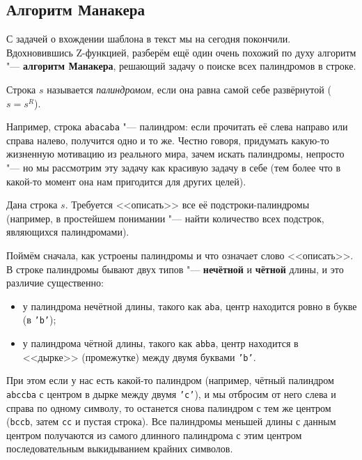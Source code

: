 \subsection{Алгоритм Манакера}

С задачей о вхождении шаблона в текст мы на сегодня покончили. Вдохновившись Z-функцией, разберём ещё один очень похожий по духу алгоритм "--- \textbf{алгоритм Манакера}, решающий задачу о поиске всех палиндромов в строке.

\begin{definition}
    Строка $s$ называется \textit{палиндромом}, если она равна самой себе развёрнутой ($s = s^R$).
\end{definition}

Например, строка \texttt{abacaba} "--- палиндром: если прочитать её слева направо или справа налево, получится одно и то же. Честно говоря, придумать какую-то жизненную мотивацию из реального мира, зачем искать палиндромы, непросто "--- но мы рассмотрим эту задачу как красивую задачу в себе (тем более что в какой-то момент она нам пригодится для других целей).

\begin{problem}
    Дана строка $s$. Требуется <<описать>> все её подстроки-палиндромы (например, в простейшем понимании "--- найти количество всех подстрок, являющихся палиндромами).
\end{problem}

Поймём сначала, как устроены палиндромы и что означает слово <<описать>>. В строке палиндромы бывают двух типов "--- \textbf{нечётной} и \textbf{чётной} длины, и это различие существенно:
\begin{itemize}
    \item у палиндрома нечётной длины, такого как \texttt{aba}, центр находится ровно в букве (в \texttt{'b'});
    \item у палиндрома чётной длины, такого как \texttt{abba}, центр находится в <<дырке>> (промежутке) между двумя буквами \texttt{'b'}.
\end{itemize}

При этом если у нас есть какой-то палиндром (например, чётный палиндром \texttt{abccba} с центром в дырке между двумя \texttt{'c'}), и мы отбросим от него слева и справа по одному символу, то останется снова палиндром с тем же центром (\texttt{bccb}, затем \texttt{cc} и пустая строка). Все палиндромы меньшей длины с данным центром получаются из самого длинного палиндрома с этим центром последовательным выкидыванием крайних символов.

